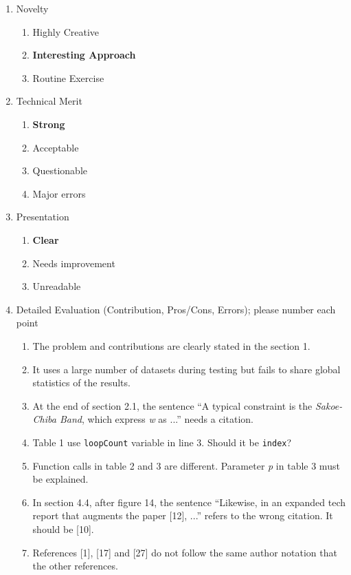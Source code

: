 \documentclass{article}
\begin{document}
\begin{enumerate}
 \item Novelty
 \begin{enumerate}[I]
  \item Highly Creative
  \item \textbf{Interesting Approach}
  \item Routine Exercise
 \end{enumerate} 
 
 \item Technical Merit
 \begin{enumerate}[I]
  \item \textbf{Strong}
  \item Acceptable
  \item Questionable
  \item Major errors
 \end{enumerate} 
 
 \item Presentation
 \begin{enumerate}[I]
  \item \textbf{Clear}
  \item Needs improvement
  \item Unreadable
 \end{enumerate}
 
 \item Detailed Evaluation (Contribution, Pros/Cons, Errors); please number each point
 \begin{framed}
  \begin{enumerate}
    \item The problem and contributions are clearly stated in the section 1.  
    \item It uses a large number of datasets during testing but fails to share global statistics of the results.
    \item At the end of section 2.1, the sentence ``A typical constraint is the \textit{Sakoe-Chiba Band}, which express \textit{w} as ...'' needs a citation.
    \item Table 1 use \texttt{loopCount} variable in line 3. Should it be \texttt{index}?
    \item Function calls in table 2 and 3 are different.  Parameter \textit{p} in table 3 must be explained.
    \item In section 4.4, after figure 14, the sentence ``Likewise, in an expanded tech report that augments the paper [12], ...'' refers to the wrong citation. It should be [10].
    \item References [1], [17] and [27] do not follow the same author notation that the other references.
  \end{enumerate}
 \end{framed}
 

\end{enumerate}
\end{document}
